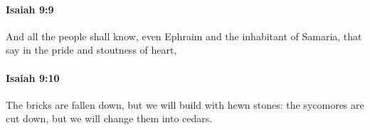 		\paragraph{Isaiah 9:9} %
			\label{ISAIAH-9-9}

			And all the people shall know, even Ephraim and the inhabitant of Samaria, that say in the pride and stoutness of heart,


		\paragraph{Isaiah 9:10} %
			\label{ISAIAH-9-10}

			The bricks are fallen down, but we will build with hewn stones: the sycomores are cut down, but we will change them into cedars.


